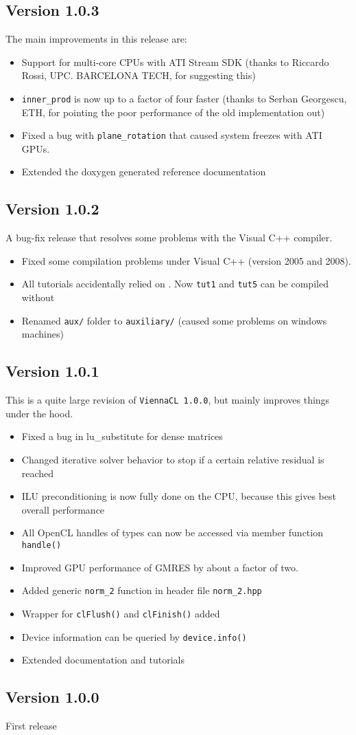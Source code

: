 \subsection*{Version 1.0.3} 
The main improvements in this release are:
\begin{itemize}
 \item Support for multi-core CPUs with ATI Stream SDK (thanks to Riccardo Rossi, UPC. BARCELONA TECH, for suggesting this)
 \item \lstinline|inner_prod| is now up to a factor of four faster (thanks to Serban Georgescu, ETH, for pointing the poor performance of the old implementation out)
 \item Fixed a bug with \lstinline|plane_rotation| that caused system freezes with ATI GPUs.
 \item Extended the doxygen generated reference documentation 
\end{itemize}

\subsection*{Version 1.0.2} 
A bug-fix release that resolves some problems with the Visual C++ compiler.
\begin{itemize}
 \item Fixed some compilation problems under Visual C++ (version 2005 and 2008).
 \item All tutorials accidentally relied on {\ublas}. Now \texttt{tut1} and \texttt{tut5} can be compiled without {\ublas}
 \item Renamed \texttt{aux/} folder to \texttt{auxiliary/} (caused some problems on windows machines)
\end{itemize}

\subsection*{Version 1.0.1} 
This is a quite large revision of \texttt{ViennaCL 1.0.0}, but mainly improves things under the hood.
\begin{itemize}
 \item Fixed a bug in lu\_substitute for dense matrices
 \item Changed iterative solver behavior to stop if a certain relative residual is reached
 \item ILU preconditioning is now fully done on the CPU, because this gives best overall performance
 \item All OpenCL handles of {\ViennaCL} types can now be accessed via member function \texttt{handle()}
 \item Improved GPU performance of GMRES by about a factor of two.
 \item Added generic \texttt{norm\_2} function in header file \texttt{norm\_2.hpp}
 \item Wrapper for \texttt{clFlush()} and \texttt{clFinish()} added
 \item Device information can be queried by \texttt{device.info()}
 \item Extended documentation and tutorials
\end{itemize}

\subsection*{Version 1.0.0}
First release
